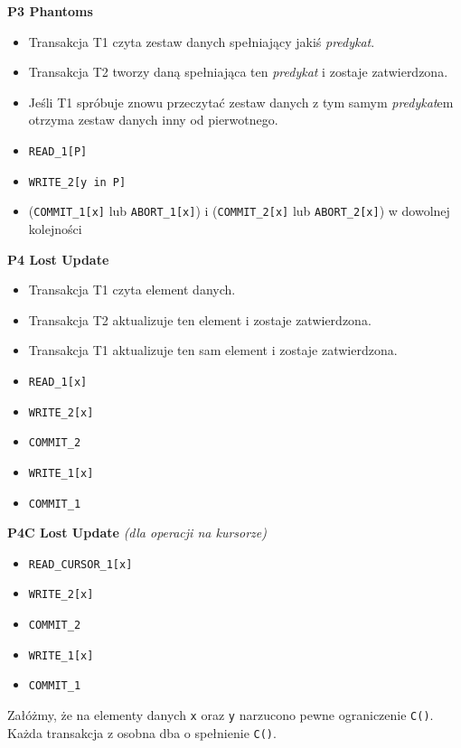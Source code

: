 \documentclass[a5paper,6pt]{article}
\begin{document}
    \textbf{P3 Phantoms}
    \begin{itemize}
        \item Transakcja T1 czyta zestaw danych spełniający jakiś
              \textit{predykat}.
        \item Transakcja T2 tworzy daną spełniająca ten \textit{predykat} i
              zostaje zatwierdzona.
        \item Jeśli T1 spróbuje znowu przeczytać zestaw danych z tym samym
              \textit{predykat}em otrzyma zestaw danych inny od pierwotnego.
        \item \texttt{READ\_1[P]}
        \item \texttt{WRITE\_2[y in P]}
        \item (\texttt{COMMIT\_1[x]} lub \texttt{ABORT\_1[x]}) i
              (\texttt{COMMIT\_2[x]} lub \texttt{ABORT\_2[x]})
              w dowolnej kolejności
    \end{itemize}

    \textbf{P4 Lost Update}
    \begin{itemize}
        \item Transakcja T1 czyta element danych.
        \item Transakcja T2 aktualizuje ten element i zostaje zatwierdzona.
        \item Transakcja T1 aktualizuje ten sam element i zostaje zatwierdzona.
        \item \texttt{READ\_1[x]}
        \item \texttt{WRITE\_2[x]}
        \item \texttt{COMMIT\_2}
        \item \texttt{WRITE\_1[x]}
        \item \texttt{COMMIT\_1}
    \end{itemize}

    \textbf{P4C Lost Update} \textit{(dla operacji na kursorze)}
    \begin{itemize}
        \item \texttt{READ\_CURSOR\_1[x]}
        \item \texttt{WRITE\_2[x]}
        \item \texttt{COMMIT\_2}
        \item \texttt{WRITE\_1[x]}
        \item \texttt{COMMIT\_1}
    \end{itemize}

    Załóżmy, że na elementy danych \texttt{x} oraz \texttt{y} narzucono pewne
    ograniczenie \texttt{C()}. Każda transakcja z osobna dba o spełnienie
    \texttt{C()}.\\
\end{document}
